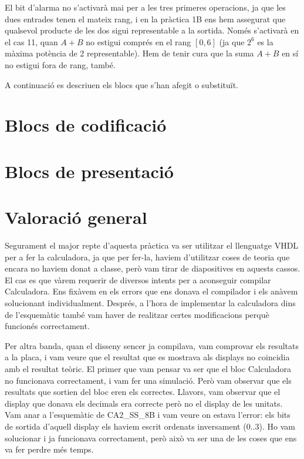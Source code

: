 El bit d'alarma no s'activarà mai per a les tres primeres operacions, ja que les
dues entrades tenen el mateix rang, i en la pràctica 1B ens hem assegurat
que qualsevol producte de les dos sigui representable a la sortida. Només
s'activarà en el cas 11, quan $A+B$ no estigui comprés en el rang $\left[0,
6\right]$ (ja que $2^6$ es la màxima potència de 2 representable). Hem de tenir
cura que la suma $A+B$ en sí no estigui fora de rang, també.

A continuació es descriuen els blocs que s'han afegit o substituït.

  \cclearpage
\section{Blocs de codificació}

  \cclearpage
\section{Blocs de presentació}
  \cclearpage
{}

\section{Valoració general}

Segurament el major repte d'aquesta pràctica va ser utilitzar el llenguatge VHDL per a fer la calculadora, ja que per fer-la, haviem d'utilitzar coses de teoria que encara no haviem donat a classe, però vam tirar de diapositives en aquests cassos. El cas es que vàrem requerir de diversos intents per a aconseguir compilar \textsf{Calculadora}. Ens fixàvem en els errors que ens donava el compilador i els anàvem solucionant individualment. Després, a l'hora de implementar la calculadora dins de l'esquemàtic també vam haver de realitzar certes modificacions perquè funcionés correctament.

Per altra banda, quan el disseny sencer ja compilava, vam comprovar els resultats a la placa, i vam veure que el resultat que es mostrava als displays no coincidia amb el resultat teòric. El primer que vam pensar va ser que el bloc \textsf{Calculadora} no funcionava correctament, i vam fer una simulació. Però vam observar que els resultats que sortien del bloc eren els correctes. Llavors, vam observar que el display que donava els decimals era correcte però no el display de les unitats. Vam anar a l'esquemàtic de \textsf{CA2\_SS\_8B} i vam veure on estava l'error: els bits de sortida d'aquell display els haviem escrit ordenats inversament ($0..3$). Ho vam solucionar i ja funcionava correctament, però això va ser una de les coses que ens va fer perdre més temps.

